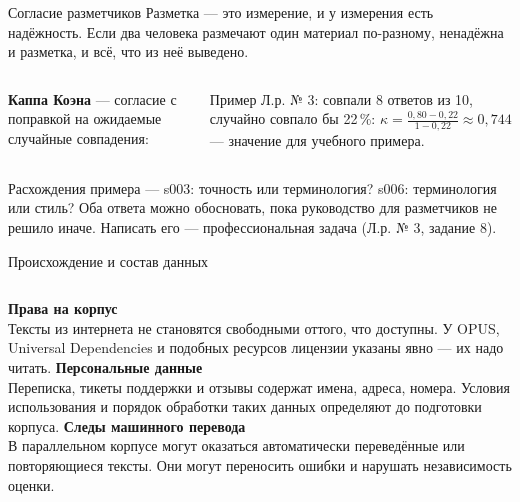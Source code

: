 \documentclass[aspectratio=169,12pt]{beamer}
\newcommand{\пр}{\kern0.04em\vrule height0.45ex depth0pt width0.06em%
  \vrule height0.06em depth0pt width0.42em\vrule height0.45ex depth0pt width0.06em\kern0.04em}
\newcommand{\формула}[1]{\par\vspace{0.25em}{\centering$\displaystyle #1$\par}\vspace{0.25em}}
\newcommand{\блок}[3]{%
  \vspace{1.4cm}
  {\color{brick}\small\bfseries БЛОК #1\par}
  \vspace{0.6cm}
  {\color{navy}\fontsize{28}{32}\selectfont\bfseries #2\par}
  \vspace{0.6cm}
  {\color{ink}\large #3\par}}
\begin{document}
\begin{frame}{Согласие разметчиков}
\color{ink}
  \relax
  {\small Разметка — это измерение, и у измерения есть надёжность. Если два
  человека размечают один материал по-разному, ненадёжна и разметка, и всё,
  что из неё выведено.}

  \vspace{0.5em}
  \begin{columns}[T,onlytextwidth]
      {\small
      \textbf{Каппа Коэна} — согласие с поправкой на ожидаемые случайные совпадения:
      \формула{\kappa = \frac{p_{\text{совп}} - p_{\text{случ}}}{1 - p_{\text{случ}}}}
      Пример Л.р. № 3: совпали 8 ответов из 10, случайно совпало бы 22\,\%:
      $\kappa = \tfrac{0{,}80 - 0{,}22}{1 - 0{,}22} \approx 0{,}744$ —
      значение для учебного примера.}
  \end{columns}

  \vspace{0.5em}
  {\small Расхождения примера — s003: точность или терминология? s006:
  терминология или стиль? Оба ответа можно обосновать, пока руководство для
  разметчиков не решило иначе. Написать его — профессиональная задача
  (Л.р. № 3, задание 8).}
\end{frame}

\begin{frame}{Происхождение и состав данных}
\color{ink}
  \begin{columns}[T,onlytextwidth]
      {\color{navy}\bfseries Права на корпус}\\[0.3em]
      {\small Тексты из интернета не становятся свободными оттого, что
      доступны. У OPUS, Universal Dependencies и подобных ресурсов
      лицензии указаны явно — их надо читать.}
      {\color{navy}\bfseries Персональные данные}\\[0.3em]
      {\small Переписка, тикеты поддержки и отзывы содержат имена,
      адреса, номера. Условия использования и порядок обработки таких данных определяют до подготовки корпуса.}
      {\color{navy}\bfseries Следы машинного перевода}\\[0.3em]
      {\small В параллельном корпусе могут оказаться автоматически переведённые или повторяющиеся тексты. Они могут переносить ошибки и нарушать независимость оценки.}
  \end{columns}

  \vspace{1.0em}
\end{frame}
\end{document}
